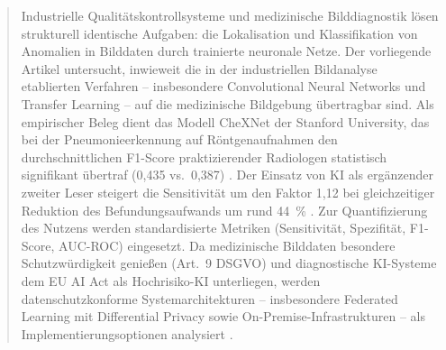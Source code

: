 \begin{abstract}
    Industrielle Qualitätskontrollsysteme und medizinische Bilddiagnostik lösen
    strukturell identische Aufgaben: die Lokalisation und Klassifikation von Anomalien
    in Bilddaten durch trainierte neuronale Netze. Der vorliegende Artikel untersucht,
    inwieweit die in der industriellen Bildanalyse etablierten Verfahren -- insbesondere
    Convolutional Neural Networks und Transfer Learning -- auf die medizinische Bildgebung
    übertragbar sind. Als empirischer Beleg dient das Modell CheXNet der Stanford
    University, das bei der Pneumonieerkennung auf Röntgenaufnahmen den durchschnittlichen
    F1-Score praktizierender Radiologen statistisch signifikant übertraf (0{,}435 vs.\
    0{,}387) \cite{chexnet2017}. Der Einsatz von KI als ergänzender zweiter Leser steigert
    die Sensitivität um den Faktor 1{,}12 bei gleichzeitiger Reduktion des Befundungsaufwands
    um rund 44~\% \cite{breastScreening2025}. Zur Quantifizierung des Nutzens werden
    standardisierte Metriken (Sensitivität, Spezifität, F1-Score, AUC-ROC) eingesetzt.
    Da medizinische Bilddaten besondere Schutzwürdigkeit genießen (Art.~9 DSGVO) und
    diagnostische KI-Systeme dem EU AI Act als Hochrisiko-KI unterliegen, werden
    datenschutzkonforme Systemarchitekturen -- insbesondere Federated Learning mit
    Differential Privacy sowie On-Premise-Infrastrukturen -- als Implementierungsoptionen
    analysiert \cite{federatedLearning2022, euAiAct2024}.
\end{abstract}
